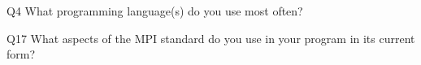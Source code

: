\begin{description}%
\item{Q4} What programming language(s) do you use most often?%
\item{Q17} What aspects of the MPI standard do you use in your program in its current form?%
\end{description}%
